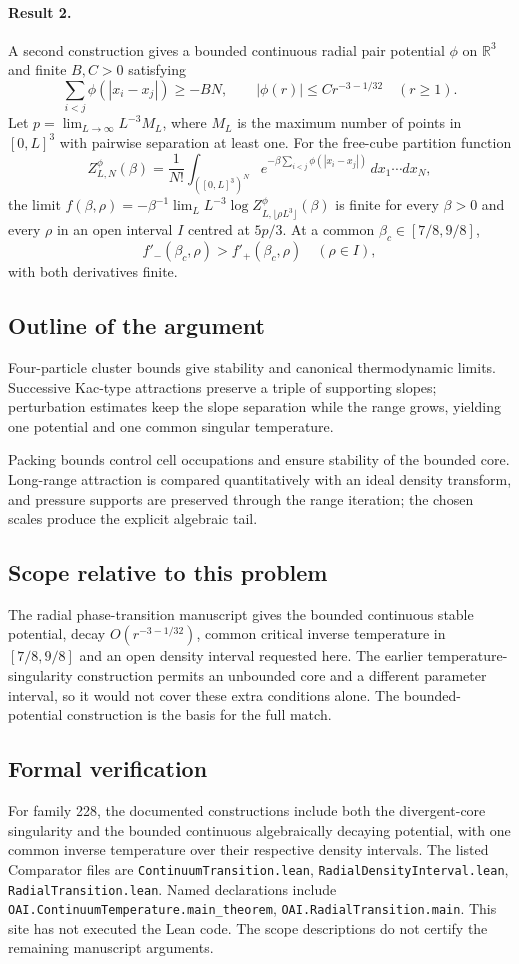 \documentclass[11pt]{article}
\begin{document}
\paragraph{Result 2.} A second construction gives a bounded continuous radial pair potential $\phi$ on $\mathbb R^3$ and finite $B,C>0$ satisfying
\[
 \sum_{i<j}\phi(|x_i-x_j|)\ge-BN,\qquad |\phi(r)|\le Cr^{-3-1/32}\quad(r\ge1).
\]
Let $p=\lim_{L\to\infty}L^{-3}M_L$, where $M_L$ is the maximum number of points in $[0,L]^3$ with pairwise separation at least one. For the free-cube partition function
\[
 Z_{L,N}^\phi(\beta)=\frac1{N!}\int_{([0,L]^3)^N}
 e^{-\beta\sum_{i<j}\phi(|x_i-x_j|)}\,dx_1\cdots dx_N,
\]
the limit $f(\beta,\rho)=-\beta^{-1}\lim_LL^{-3}\log Z_{L,\lfloor\rho L^3\rfloor}^\phi(\beta)$ is finite for every $\beta>0$ and every $\rho$ in an open interval $I$ centred at $5p/3$. At a common $\beta_c\in[7/8,9/8]$,
\[
 f'_-(\beta_c,\rho)>f'_+(\beta_c,\rho)\quad(\rho\in I),
\]
with both derivatives finite.

\subsection{Outline of the argument}
Four-particle cluster bounds give stability and canonical thermodynamic limits. Successive Kac-type attractions preserve a triple of supporting slopes; perturbation estimates keep the slope separation while the range grows, yielding one potential and one common singular temperature.

Packing bounds control cell occupations and ensure stability of the bounded core. Long-range attraction is compared quantitatively with an ideal density transform, and pressure supports are preserved through the range iteration; the chosen scales produce the explicit algebraic tail.

\subsection{Scope relative to this problem}
The radial phase-transition manuscript gives the bounded continuous stable potential, decay $O(r^{-3-1/32})$, common critical inverse temperature in $[7/8,9/8]$ and an open density interval requested here. The earlier temperature-singularity construction permits an unbounded core and a different parameter interval, so it would not cover these extra conditions alone. The bounded-potential construction is the basis for the full match.

\subsection{Formal verification}
For family 228, the documented constructions include both the divergent-core singularity and the bounded continuous algebraically decaying potential, with one common inverse temperature over their respective density intervals. The listed Comparator files are \texttt{ContinuumTransition.lean}, \texttt{RadialDensityInterval.lean}, \texttt{RadialTransition.lean}. Named declarations include \texttt{OAI.ContinuumTemperature.main\_theorem}, \texttt{OAI.RadialTransition.main}. This site has not executed the Lean code. The scope descriptions do not certify the remaining manuscript arguments.
\end{document}
